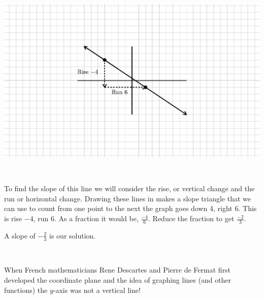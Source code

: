 \begin{example}\label{Lin46}
~\end{example}  
  \begin{multicols}{2}
    \includegraphics[scale=.9,bb = 115 65 310 190, clip=true]{II_1_3c-1.eps}
    
    \
    
    To find the slope of this line we will consider the rise, or vertical
    change and the run or horizontal change. Drawing these lines in makes a
    slope triangle that we can use to count from one point to the next the
    graph goes down 4, right 6. This is rise $- 4$, run 6. As a fraction it
    would be, $\frac{- 4}{6}$. Reduce the fraction to get $\frac{-2}{3}$.
  \end{multicols}
\begin{center}
A slope of $-\displaystyle\frac{2}{3}$ is our solution.
\end{center}%
~\par
 {}When French mathematicians Rene Descartes and
Pierre de Fermat first developed the coordinate plane and the idea of graphing
lines (and other functions) the $y$-axis was not a vertical line!\pp


